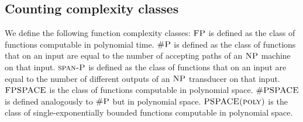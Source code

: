 



\subsection{Counting complexity classes}


We define the following function complexity classes: $\text{\sc FP}$ is defined as the class of functions computable in polynomial time. $\text{\sc \#P}$ is defined as the class of functions that on an input are equal to the number of accepting paths of an $\text{\sc NP}$ machine on that input. $\text{\sc span-P}$ is defined as the class of functions that on an input are equal to the number of different outputs of an $\text{\sc NP}$ transducer on that input. $\text{\sc FPSPACE}$ is the class of functions computable in polynomial space. $\text{\sc \#PSPACE}$ is defined analogously to $\text{\sc \#P}$ but in polynomial space. $\text{\sc PSPACE(poly)}$ is the class of single-exponentially bounded functions computable in polynomial space. 


